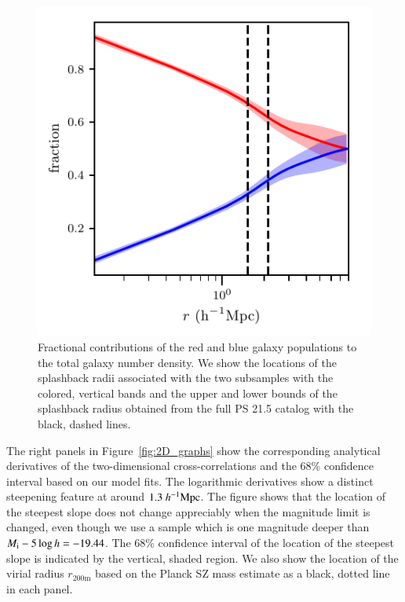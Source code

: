 \documentclass[iop, apjl, twocolappendix, numberedappendix]{emulateapj}
\def\mpch{h^{-1}{\rm Mpc}}
\begin{document}
\begin{figure}
    \includegraphics[width= \columnwidth]{color_fraction_with_spline_no_mc.pdf}
\caption{Fractional contributions of the red and blue galaxy
populations to the total galaxy number density. We show the
locations of the splashback radii associated with the two subsamples
with the colored, vertical bands and the upper and lower bounds of
the splashback radius obtained from the full PS 21.5 catalog with
the black, dashed lines.}
   \label{fig:color_fraction} 
\end{figure}
The right panels in Figure~\ref{fig:2D_graphs} show the
corresponding analytical derivatives of the two-dimensional
cross-correlations and the 68\% confidence interval based on our
model fits. The logarithmic derivatives show a distinct steepening
feature at around $1.3~\mpch$. The figure shows that the
location of the steepest slope does not change appreciably when the
magnitude limit is changed, even though we use a sample which is one
magnitude deeper than $M_{\rm i}-5\log h=-19.44$. The 68\%
confidence interval of the location of the steepest slope is
indicated by the vertical, shaded region. We also show the location
of the virial radius $r_{\mathrm{200m}}$ based on the Planck SZ mass estimate 
as a black, dotted line in each panel.
\end{document}

